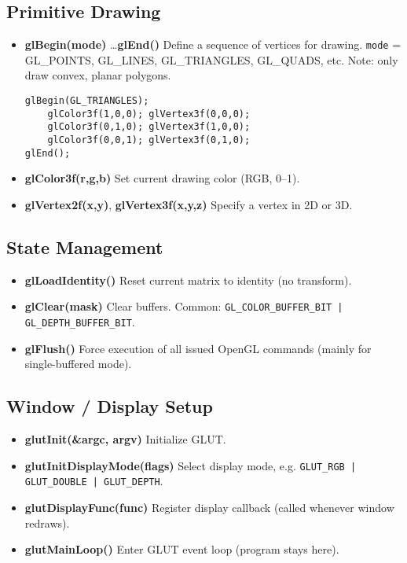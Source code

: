 \documentclass[8pt,twocolumn]{extarticle}
\begin{document}
\subsection*{Primitive Drawing}
\begin{itemize}
  \item \textbf{glBegin(mode)} \dots \textbf{glEnd()}  
  Define a sequence of vertices for drawing.  
  \texttt{mode} = GL\_POINTS, GL\_LINES, GL\_TRIANGLES, GL\_QUADS, etc. Note: only draw convex, planar polygons.
    \begin{lstlisting}
glBegin(GL_TRIANGLES);
    glColor3f(1,0,0); glVertex3f(0,0,0);
    glColor3f(0,1,0); glVertex3f(1,0,0);
    glColor3f(0,0,1); glVertex3f(0,1,0);
glEnd();\end{lstlisting}
  \item \textbf{glColor3f(r,g,b)}  
  Set current drawing color (RGB, 0–1).

  \item \textbf{glVertex2f(x,y)}, \textbf{glVertex3f(x,y,z)}  
  Specify a vertex in 2D or 3D.
\end{itemize}

\subsection*{State Management}
\begin{itemize}
  \item \textbf{glLoadIdentity()}  
  Reset current matrix to identity (no transform).

  \item \textbf{glClear(mask)}  
  Clear buffers. Common: \texttt{GL\_COLOR\_BUFFER\_BIT | GL\_DEPTH\_BUFFER\_BIT}.

  \item \textbf{glFlush()}  
  Force execution of all issued OpenGL commands (mainly for single-buffered mode).
\end{itemize}

\subsection*{Window / Display Setup}
\begin{itemize}
  \item \textbf{glutInit(\&argc, argv)}  
  Initialize GLUT.

  \item \textbf{glutInitDisplayMode(flags)}  
  Select display mode, e.g. \texttt{GLUT\_RGB | GLUT\_DOUBLE | GLUT\_DEPTH}.

  \item \textbf{glutDisplayFunc(func)}  
  Register display callback (called whenever window redraws).

  \item \textbf{glutMainLoop()}  
  Enter GLUT event loop (program stays here).
\end{itemize}
\end{document}
